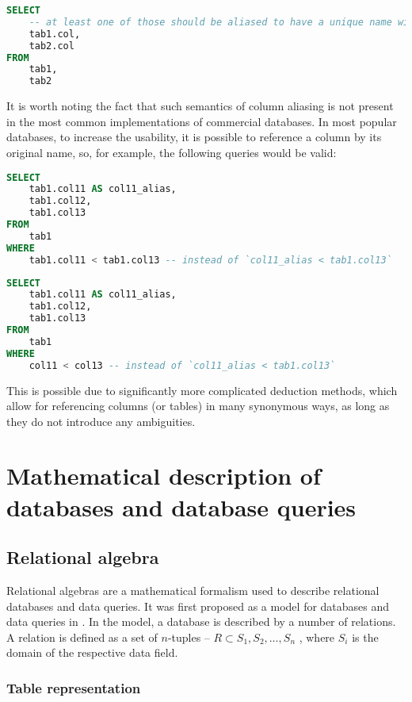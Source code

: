 \documentclass[magisterska,en]{pracamgr}
\begin{document}
\begin{lstlisting}[language=SQL]
SELECT
    -- at least one of those should be aliased to have a unique name within this scope
    tab1.col,
    tab2.col
FROM
    tab1,
    tab2
\end{lstlisting}


It is worth noting the fact that such semantics of column aliasing is not present in the most common implementations of commercial databases. In most popular databases, to increase the usability, it is possible to reference a column by its original name, so, for example, the following queries would be valid:

\begin{lstlisting}[language=SQL]
SELECT
    tab1.col11 AS col11_alias,
    tab1.col12,
    tab1.col13
FROM
    tab1
WHERE
    tab1.col11 < tab1.col13 -- instead of `col11_alias < tab1.col13`
\end{lstlisting}
\begin{lstlisting}[language=SQL]
SELECT
    tab1.col11 AS col11_alias,
    tab1.col12,
    tab1.col13
FROM
    tab1
WHERE
    col11 < col13 -- instead of `col11_alias < tab1.col13`
\end{lstlisting}

This is possible due to significantly more complicated deduction methods, which allow for referencing columns (or tables) in many synonymous ways, as long as they do not introduce any ambiguities.







\chapter{Mathematical description of databases and database queries}

\section{Relational algebra}

Relational algebras are a mathematical formalism used to describe relational databases and data queries. It was first proposed as a model for databases and data queries in \cite{codd}. In the model, a database is described by a number of relations. A relation is defined as a set of $n$-tuples -- $R \subset S_1, S_2, \dots, S_n$ , where $S_i$ is the domain of the respective data field.

\subsection{Table representation}
\end{document}
